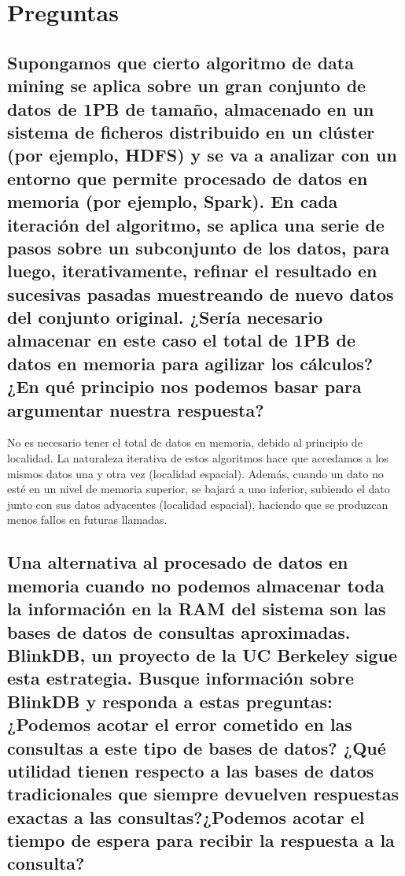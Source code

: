 \documentclass[12pt,a4paper,twoside,openright,titlepage,final]{article}
\author{José Ignacio Escribano}
\title{}
\begin{document}
\setcounter{page}{1}


\tableofcontents
\thispagestyle{empty}
\newpage

\setcounter{page}{1}


\section{Preguntas}

\subsection{Supongamos que cierto algoritmo de data mining se aplica sobre un gran conjunto de datos de 1PB de tamaño, almacenado en un sistema de ficheros distribuido en un clúster (por ejemplo, HDFS) y se va a analizar con un entorno que permite procesado de datos en memoria (por ejemplo, Spark). En cada iteración del algoritmo, se aplica una serie de pasos sobre un subconjunto de los datos, para luego, iterativamente, refinar el resultado en sucesivas pasadas muestreando de nuevo datos del conjunto original. ¿Sería necesario almacenar en este caso el total de 1PB de datos en memoria para agilizar los cálculos? ¿En qué principio nos podemos basar para argumentar nuestra respuesta?}

No es necesario tener el total de datos en memoria, debido al principio de localidad. La naturaleza iterativa de estos algoritmos hace que accedamos a los mismos datos una y otra vez (localidad espacial). Además,  cuando un dato no esté en un nivel de memoria superior, se bajará a uno inferior, subiendo el dato junto con sus datos adyacentes (localidad espacial), haciendo que se produzcan menos fallos en futuras llamadas.

\subsection{Una alternativa al procesado de datos en memoria cuando no podemos almacenar toda la información en la RAM del sistema son las bases de datos de consultas aproximadas. BlinkDB, un proyecto de la UC Berkeley sigue esta estrategia. Busque información sobre BlinkDB y responda a estas preguntas: ¿Podemos acotar el error cometido en las consultas a este tipo de bases de datos? ¿Qué utilidad tienen respecto a las bases de datos tradicionales que siempre devuelven respuestas exactas a las consultas?¿Podemos acotar el tiempo de espera para recibir la respuesta a la consulta?}
\end{document}
